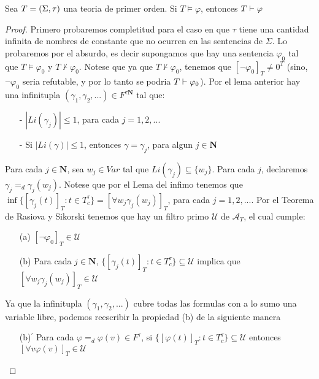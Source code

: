 \begin{theorem}
  Sea $T=(\Sigma,\tau)$ una teoria de primer orden. Si $T\models\varphi$, entonces $T\vdash\varphi$
\end{theorem}
\begin{proof}
  Primero probaremos completitud para el caso en que $\tau $ tiene una
cantidad infinita de nombres de constante que no ocurren en las sentencias de $
\Sigma$. Lo probaremos por el absurdo, es decir supongamos que hay una
sentencia $\varphi_0$ tal que $T\models\varphi_0$ y $T\not\vdash
\varphi_0$. Notese que ya que $T\not\vdash\varphi_0$, tenemos que $
[\neg\varphi_0]_{T}\not=0^{T}$ (sino, $\neg\varphi_0$ seria refutable, y por lo tanto se podria $T\vdash\varphi_0$). Por el lema anterior hay una
infinitupla $(\gamma _{1},\gamma _{2},...)\in F^{\tau \mathbf{N}}$ tal que:

\begin{enumerate}
\item[-] $\left\vert Li(\gamma _{j})\right\vert \leq 1$, para cada $
j=1,2,... $

\item[-] Si $\left\vert Li(\gamma )\right\vert \leq 1$, entonces $\gamma
=\gamma _{j}$, para algun $j\in \mathbf{N}$
\end{enumerate}

\noindent Para cada $j\in \mathbf{N}$, sea $w_{j}\in Var$ tal que $Li(\gamma
_{j})\subseteq \{w_{j}\}$. Para cada $j$, declaremos $\gamma _{j}=_{d}\gamma
_{j}(w_{j})$. Notese que por el Lema del infimo tenemos que $\inf
\{[\gamma _{j}(t)]_{T}:t\in T_{c}^{\tau }\}=[\forall w_{j}\gamma
_{j}(w_{j})]_{T}$, para cada $j=1,2,...$. Por el Teorema de Rasiova y
Sikorski tenemos que hay un filtro primo $\mathcal{U}$ de $\mathcal{A}_{T}$,
el cual cumple:

\begin{enumerate}
\item[(a)] $[\neg \varphi_0]_{T}\in \mathcal{U}$

\item[(b)] Para cada $j\in \mathbf{N}$, $\{[\gamma _{j}(t)]_{T}:t\in
T_{c}^{\tau }\}\subseteq \mathcal{U}$ implica que $[\forall w_{j}\gamma
_{j}(w_{j})]_{T}\in \mathcal{U}$
\end{enumerate}

\noindent Ya que la infinitupla $(\gamma _{1},\gamma _{2},...)$ cubre todas
las formulas con a lo sumo una variable libre, podemos reescribir la
propiedad (b) de la siguiente manera

\begin{enumerate}
\item[(b)$^{\prime}$] Para cada $\varphi =_{d}\varphi (v)\in F^{\tau }$, si 
$\{[\varphi(t)]_{T}:t\in T_{c}^{\tau }\}\subseteq \mathcal{U}$ entonces $%
[\forall v\varphi (v)]_{T}\in \mathcal{U}$
\end{enumerate}


\end{proof}
